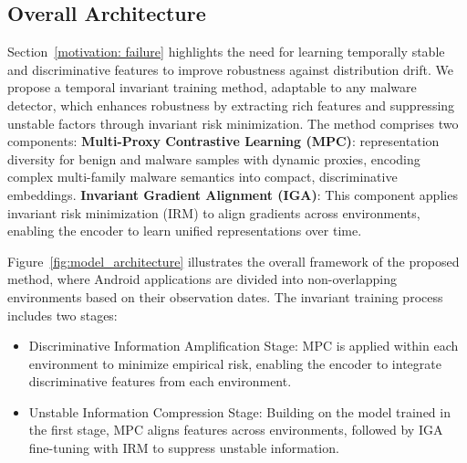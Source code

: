 \subsection{Overall Architecture}
Section~\ref{motivation: failure} highlights the need for learning temporally stable and discriminative features to improve robustness against distribution drift. We propose a temporal invariant training method, adaptable to any malware detector, which enhances robustness by extracting rich features and suppressing unstable factors through invariant risk minimization. The method comprises two components: \textbf{Multi-Proxy Contrastive Learning (MPC)}: representation diversity for benign and malware samples with dynamic proxies, encoding complex multi-family malware semantics into compact, discriminative embeddings. \textbf{Invariant Gradient Alignment (IGA)}: This component applies invariant risk minimization (IRM) to align gradients across environments, enabling the encoder to learn unified representations over time.


Figure~\ref{fig:model_architecture} illustrates the overall framework of the proposed method, where Android applications are divided into non-overlapping environments based on their observation dates. The invariant training process includes two stages: 
\begin{itemize}
    \item Discriminative Information Amplification Stage: MPC is applied within each environment to minimize empirical risk, enabling the encoder to integrate discriminative features from each environment.
    \item Unstable Information Compression Stage: Building on the model trained in the first stage, MPC aligns features across environments, followed by IGA fine-tuning with IRM to suppress unstable information.
\end{itemize}


